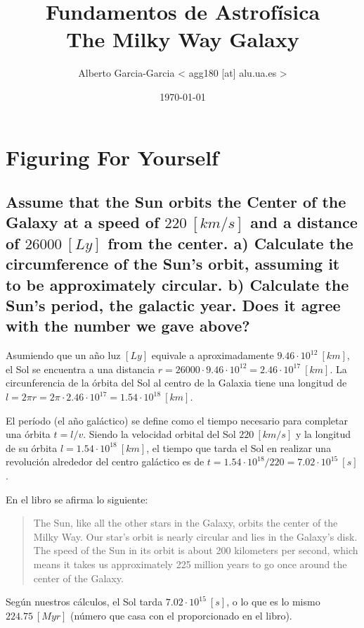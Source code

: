 \documentclass{tufte-handout}
\title{Fundamentos de Astrofísica\\ The Milky Way Galaxy}
\author[Alberto Garcia-Garcia]{Alberto Garcia-Garcia < agg180 [at] alu.ua.es >}
\date{\today}  %
\begin{document}
\maketitle%

\section{Figuring For Yourself}

\subsection{\textbf{Assume that the Sun orbits the Center of the Galaxy at a speed of $220~[km/s]$ and a distance of $26000~[Ly]$ from the center. a) Calculate the circumference of the Sun's orbit, assuming it to be approximately circular. b) Calculate the Sun's period, the galactic year. Does it agree with the number we gave above?}}

Asumiendo que un año luz $[Ly]$ equivale a aproximadamente $9.46 \cdot 10^{12}~[km]$, el Sol se encuentra a una distancia $r = 26000 \cdot 9.46 \cdot 10^{12} = 2.46 \cdot 10^{17}~[km]$. La circunferencia de la órbita del Sol al centro de la Galaxia tiene una longitud de $l = 2 \pi r = 2 \pi \cdot 2.46 \cdot 10^{17} = 1.54 \cdot 10^{18} ~ [km]$.

El período (el año galáctico) se define como el tiempo necesario para completar una órbita $ t = l / v$. Siendo la velocidad orbital del Sol $220~[km/s]$ y la longitud de su órbita $l = 1.54 \cdot 10^{18}~[km]$, el tiempo que tarda el Sol en realizar una revolución alrededor del centro galáctico es de $t = 1.54 \cdot 10^{18} / 220 = 7.02 \cdot 10^{15}~[s]$.

En el libro se afirma lo siguiente:

\begin{quotation}
  The Sun, like all the other stars in the Galaxy, orbits the center of the Milky Way. Our star’s orbit is nearly circular
and lies in the Galaxy’s disk. The speed of the Sun in its orbit is about 200 kilometers per second, which means
it takes us approximately 225 million years to go once around the center of the Galaxy.
\end{quotation}

Según nuestros cálculos, el Sol tarda $7.02 \cdot 10^{15}~[s]$, o lo que es lo mismo $224.75~[Myr]$ (número que casa con el proporcionado en el libro).



\end{document}
